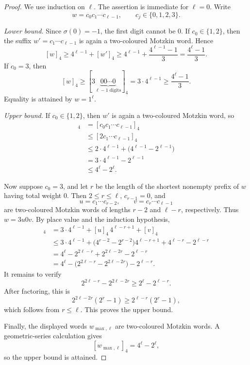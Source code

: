 \documentclass[12pt]{article}
\theoremstyle{plain}
\theoremstyle{definition}
\theoremstyle{plain}
\begin{document}
\begin{proof}
We use induction on $\ell$.  The assertion is immediate for $\ell=0$.
Write
\[
 w=c_0c_1\cdots c_{\ell-1},
 \qquad
 c_j\in\{0,1,2,3\}.
\]

\emph{Lower bound.}
Since $\sigma(0)=-1$, the first digit cannot be $0$.  If
$c_0\in\{1,2\}$, then the suffix $w'=c_1\cdots c_{\ell-1}$ is again a
two-coloured Motzkin word.  Hence
\[
  [w]_4\geq4^{\ell-1}+[w']_4
  \geq4^{\ell-1}+\frac{4^{\ell-1}-1}{3}
  =\frac{4^{\ell}-1}{3}.
\]
If $c_0=3$, then
\[
  [w]_4
  \geq[3\underbrace{00\cdots0}_{\ell-1\text{ digits}}]_4
  =3\cdot4^{\ell-1}
  \geq\frac{4^{\ell}-1}{3}.
\]
Equality is attained by $w=1^{\ell}$.

\emph{Upper bound.}
If $c_0\in\{1,2\}$, then $w'$ is again a two-coloured Motzkin word, so
\begin{align*}
  [w]_4
  &=[c_0c_1\cdots c_{\ell-1}]_4\\
  &\leq[2c_1\cdots c_{\ell-1}]_4\\
  &\leq2\cdot4^{\ell-1}+\bigl(4^{\ell-1}-2^{\ell-1}\bigr)\\
  &=3\cdot4^{\ell-1}-2^{\ell-1}\\
  &\leq4^{\ell}-2^{\ell}.
\end{align*}

Now suppose $c_0=3$, and let $r$ be the length of the shortest nonempty prefix
of $w$ having total weight $0$.  Then $2\leq r\leq\ell$,
$c_{r-1}=0$, and
\[
  u=c_1\cdots c_{r-2},
  \qquad
  v=c_r\cdots c_{\ell-1}
\]
are two-coloured Motzkin words of lengths $r-2$ and $\ell-r$, respectively.
Thus $w=3u0v$.  By place value and the induction hypothesis,
\begin{align*}
  [w]_4
  &=3\cdot4^{\ell-1}+[u]_4\,4^{\ell-r+1}+[v]_4\\
  &\leq3\cdot4^{\ell-1}
    +\bigl(4^{r-2}-2^{r-2}\bigr)4^{\ell-r+1}
    +4^{\ell-r}-2^{\ell-r}\\
  &=4^{\ell}-2^{2\ell-r}+2^{2\ell-2r}-2^{\ell-r}\\
  &=4^{\ell}-\bigl(2^{2\ell-r}-2^{2\ell-2r}\bigr)-2^{\ell-r}.
\end{align*}
It remains to verify
\[
  2^{2\ell-r}-2^{2\ell-2r}
  \geq2^{\ell}-2^{\ell-r}.
\]
After factoring, this is
\[
  2^{2\ell-2r}(2^r-1)\geq2^{\ell-r}(2^r-1),
\]
which follows from $r\leq\ell$.  This proves the upper bound.

Finally, the displayed words $w_{\max,\ell}$ are two-coloured Motzkin words.
A geometric-series calculation gives
\[
  [w_{\max,\ell}]_4=4^{\ell}-2^{\ell},
\]
so the upper bound is attained.
\end{proof}
\end{document}
